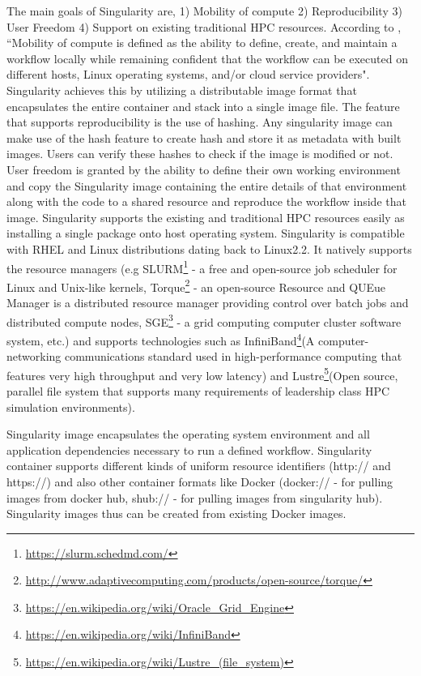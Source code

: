The main goals of Singularity are, 1) Mobility of compute 2) Reproducibility 3) User Freedom 4) Support on existing traditional HPC resources. According to \cite{10.1371/journal.pone.0177459}, ``Mobility of compute is defined as the ability to define, create, and maintain a workflow locally while remaining confident that the workflow can be executed on different hosts, Linux operating systems, and/or cloud service providers". Singularity achieves this by utilizing a distributable image format that encapsulates the entire container and stack into a single image file. The feature that supports reproducibility is the use of hashing. Any singularity image can make use of the hash feature to create hash and store it as metadata with built images. Users can verify these hashes to check if the image is modified or not. User freedom is granted by the ability to define their own working environment and copy the Singularity image containing the entire details of that environment along with the code to a shared resource and reproduce the workflow inside that image. Singularity supports the existing and traditional HPC resources easily as installing a single package onto host operating system. Singularity is compatible with RHEL and Linux distributions dating back to Linux2.2. It natively supports the resource managers (e.g SLURM\footnote{\url{https://slurm.schedmd.com/}} - a free and open-source job scheduler for Linux and Unix-like kernels, Torque\footnote{\url{http://www.adaptivecomputing.com/products/open-source/torque/}} - an open-source Resource and QUEue Manager is a distributed resource manager providing control over batch jobs and distributed compute nodes, SGE\footnote{\url{https://en.wikipedia.org/wiki/Oracle_Grid_Engine}} - a grid computing computer cluster software system, etc.) and supports technologies such as InfiniBand\footnote{\url{https://en.wikipedia.org/wiki/InfiniBand}}(A computer-networking communications standard used in high-performance computing that features very high throughput and very low latency) and Lustre\footnote{\url{https://en.wikipedia.org/wiki/Lustre_(file_system)}}(Open source, parallel file system that supports many requirements of leadership class HPC simulation environments).

Singularity image encapsulates the operating system environment and all application dependencies necessary to run a defined workflow. Singularity container supports different kinds of uniform resource identifiers (http:// and https://) and also other container formats like Docker (docker:// - for pulling images from docker hub, shub:// - for pulling images from singularity hub). Singularity images thus can be created from existing Docker images.


